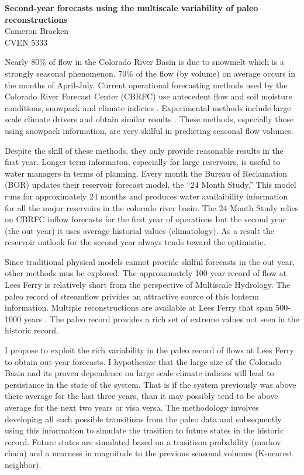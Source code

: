 \documentclass[11pt]{article}
\begin{document}
{\large\bf Second-year forecasts using the multiscale variability of paleo reconstructions}\\
Cameron Bracken\\
CVEN 5333

Nearly 80\% of flow in the Colorado River Basin is due to snowmelt which is a strongly seasonal phenomenon.  70\% of the flow (by volume) on average occurs in the months of April-July.  Current operational forecasting methods used by the Colorado River Forecast Center (CBRFC) use antecedent flow and soil moisture conditions, snowpack and climate indicies \citep{Brandon2005}.  Experimental methods include large scale climate drivers and obtain similar results \citep{Bracken:2010p2682, Regonda2006, Grantz2005}.  These methods, especially those using snowpack information, are very skilful in predicting seasonal flow volumes.  

Despite the skill of these methods, they only provide reasonable results in the first year.  Longer term informaton, especially for large reservoirs, is useful to water managers in terms of planning. Every month the Bureau of Reclamation (BOR) updates their reservoir forecast model, the ``24 Month Study.''  This model runs for approximately 24 months and produces water availaibility information for all the major reservoirs in the colorado river basin.  The 24 Month Study relies on CBRFC inflow forecasts for the first year of operations but the second year (the out year) it uses average historial values (climatology).  As a result the reservoir outlook for the second year always tends toward the optimistic. 

Since traditional physical models cannot provide skilful forecasts in the out year, other methods mus be explored.  The approxamately 100 year record of flow at Lees Ferry is relatively short from the perspective of Multiscale Hydrology.  The paleo record of streamflow privides an attractive source of this lonterm information.  Multiple reconstructions are available at Lees Ferry that span 500-1000 years \citep{Woodhouse:2006p1287, Gangopadhyay:2009p61}.  The paleo record provides a rich set of extreme values not seen in the historic record. 

I propose to exploit the rich variability in the paleo record of flows at Lees Ferry to obtain out-year forecasts.  I hypothesize that the large size of the Colorado Basin and its proven dependence on large scale climate indicies will lead to persistance in the state of the system. That is if the system previously was above there average for the last three years, than it may possibly tend to be  above average for the next two years or visa versa.  The methodology involves developing all such possible transitions from the paleo data and subsequently using this information to simulate the trasition to future states in the historic record.  Future states are simulated based on a trasitison probability (markov chain) and a nearness in magnitude to the previous seasonal volumes (K-nearest neighbor).  


\end{document}
